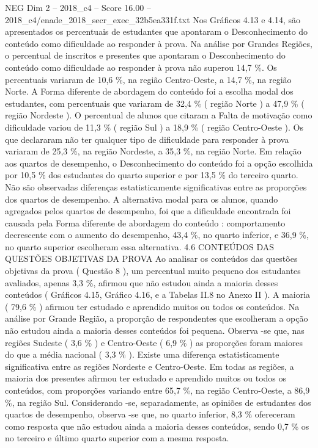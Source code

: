 \begin{textsample}{NEG Dim 2 – 2018\_c4 – Score 16.00 – 2018\_c4/enade\_2018\_secr\_exec\_32b5ea331f.txt}
Nos Gráficos 4.13 e 4.14, são apresentados os percentuais de estudantes que apontaram o Desconhecimento do conteúdo como dificuldade ao responder à prova.
Na análise por Grandes Regiões, o percentual de inscritos e presentes que apontaram o Desconhecimento do conteúdo como dificuldade ao responder à prova não superou 14,7 \%.
Os percentuais variaram de 10,6 \%, na região Centro-Oeste, a 14,7 \%, na região Norte.
A Forma diferente de abordagem do conteúdo foi a escolha modal dos estudantes, com percentuais que variaram de 32,4 \% ( região Norte ) a 47,9 \% ( região Nordeste ).
O percentual de alunos que citaram a Falta de motivação como dificuldade variou de 11,3 \% ( região Sul ) a 18,9 \% ( região Centro-Oeste ).
Os que declararam não ter qualquer tipo de dificuldade para responder à prova variaram de 25,3 \%, na região Nordeste, a 35,3 \%, na região Norte.
Em relação aos quartos de desempenho, o Desconhecimento do conteúdo foi a opção escolhida por 10,5 \% dos estudantes do quarto superior e por 13,5 \% do terceiro quarto.
Não são observadas diferenças estatisticamente significativas entre as proporções dos quartos de desempenho.
A alternativa modal para os alunos, quando agregados pelos quartos de desempenho, foi que a dificuldade encontrada foi causada pela Forma diferente de abordagem do conteúdo : comportamento decrescente com o aumento do desempenho, 43,4 \%, no quarto inferior, e 36,9 \%, no quarto superior escolheram essa alternativa. 4.6 CONTEÚDOS DAS QUESTÕES OBJETIVAS DA PROVA Ao analisar os conteúdos das questões objetivas da prova ( Questão 8 ), um percentual muito pequeno dos estudantes avaliados, apenas 3,3 \%, afirmou que não estudou ainda a maioria desses conteúdos ( Gráficos 4.15, Gráfico 4.16, e a Tabelas II.8 no Anexo II ).
A maioria ( 79,6 \% ) afirmou ter estudado e aprendido muitos ou todos os conteúdos.
Na análise por Grande Região, a proporção de respondentes que escolheram a opção não estudou ainda a maioria desses conteúdos foi pequena.
Observa -se que, nas regiões Sudeste ( 3,6 \% ) e Centro-Oeste ( 6,9 \% ) as proporções foram maiores do que a média nacional ( 3,3 \% ).
Existe uma diferença estatisticamente significativa entre as regiões Nordeste e Centro-Oeste.
Em todas as regiões, a maioria dos presentes afirmou ter estudado e aprendido muitos ou todos os conteúdos, com proporções variando entre 65,7 \%, na região Centro-Oeste, a 86,9 \%, na região Sul.
Considerando -se, separadamente, as opiniões de estudantes dos quartos de desempenho, observa -se que, no quarto inferior, 8,3 \% ofereceram como resposta que não estudou ainda a maioria desses conteúdos, sendo 0,7 \% os no terceiro e último quarto superior com a mesma resposta.

\end{textsample}
